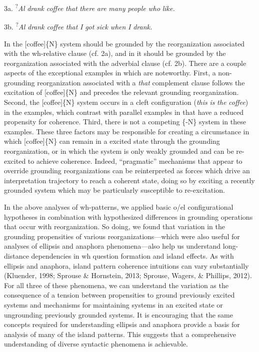   3a. \textsuperscript{?}\textit{Al} \textit{drank} \textit{coffee} \textit{that} \textit{there} \textit{are} \textit{many} \textit{people} \textit{who} \textit{like.}

  3b. \textsuperscript{?}\textit{Al} \textit{drank} \textit{coffee} \textit{that} \textit{I} \textit{got} \textit{sick} \textit{when} \textit{I} \textit{drank.}

In  the [coffee]\{N\} system should be grounded by the reorganization associated with the wh-relative clause (cf. 2a), and in  it should be grounded by the reorganization associated with the adverbial clause (cf. 2b). There are a couple aspects of the exceptional examples in  which are noteworthy. First, a non-grounding reorganization associated with a \textit{that} complement clause follows the excitation of [coffee]\{N\} and precedes the relevant grounding reorganization. Second, the [coffee]\{N\} system occurs in a cleft configuration (\textit{this} \textit{is} \textit{the} \textit{coffee}) in the  examples, which contrast with parallel examples in  that have a reduced propensity for coherence. Third, there is not a competing \{-N\} system in these examples. These three factors may be responsible for creating a circumstance in which [coffee]\{N\} can remain in a excited state through the grounding reorganization, or in which the system is only weakly grounded and can be re-excited to achieve coherence. Indeed, “pragmatic” mechanisms that appear to override grounding reorganizations can be reinterpreted as forces which drive an interpretation trajectory to reach a coherent state, doing so by exciting a recently grounded system which may be particularly susceptible to re-excitation.

In the above analyses of wh-patterns, we applied basic o/el configurational hypotheses in combination with hypothesized differences in grounding operations that occur with reorganization. So doing, we found that variation in the grounding propensities of various reorganizations—which were also useful for analyses of ellipsis and anaphora phenomena—also help us understand long-distance dependencies in wh question formation and island effects. As with ellipsis and anaphora, island pattern coherence intuitions can vary substantially (Kluender, 1998; Sprouse \& Hornstein, 2013; Sprouse, Wagers, \& Phillips, 2012). For all three of these phenomena, we can understand the variation as the consequence of a tension between propensities to ground previously excited systems and mechanisms for maintaining systems in an excited state or ungrounding previously grounded systems. It is encouraging that the same concepts required for understanding ellipsis and anaphora provide a basis for analysis of many of the island patterns. This suggests that a comprehensive understanding of diverse syntactic phenomena is achievable.

